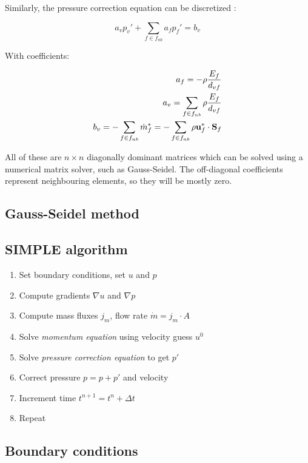 \documentclass[12pt]{article}
\newcommand{\vb}[1]{\text{\textbf{#1}}}
\begin{document}
Similarly, the pressure correction equation can be discretized \cite{mou}:

\begin{equation}
  a_v p_v' + \sum_{f \in f_{nb}} a_f p_f' = b_v
\end{equation}

With coefficients:

\begin{align}
  a_f = -\rho \frac{E_f}{d_{vf}} \\
  a_v = \sum_{f \in f_{nb}} \rho \frac{E_f}{d_{vf}}\\
  b_v = - \sum_{f \in f_{nb}} \dot m_f^* = - \sum_{f \in f_{nb}} \rho \vb u_f^* \cdot \vb S_f
\end{align}

All of these are $n \times n$ diagonally dominant matrices which can be solved using a numerical matrix solver, such as Gauss-Seidel. The off-diagonal coefficients represent neighbouring elements, so they will be mostly zero.

\subsection{Gauss-Seidel method}

\subsection{SIMPLE algorithm}

\begin{enumerate}
\item Set boundary conditions, set $u$ and $p$
\item Compute gradients $\nabla u$ and $\nabla p$
\item Compute mass fluxes $j_m$, flow rate $\dot m = j_m \cdot A$
\item Solve \textit{momentum equation} using velocity guess $u^0$
\item Solve \textit{pressure correction equation} to get $p'$
\item Correct pressure $p = p + p'$ and velocity
\item Increment time $t^{n+1} = t^n + \Delta t$
\item Repeat
\end{enumerate}

\subsection{Boundary conditions}
\end{document}
